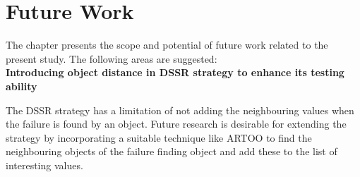 
\chapter{Future Work}
\label{chap:futureWork}
The chapter presents the scope and potential of future work related to the present study. The following areas are suggested:\\


	
\textbf{Introducing object distance in DSSR strategy to enhance its testing ability}

The DSSR strategy has a limitation of not adding the neighbouring values when the failure is found by an object. Future research is desirable for extending the strategy by incorporating a suitable technique like ARTOO to find the neighbouring objects of the failure finding object and add these to the list of interesting values.  


